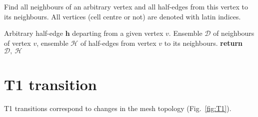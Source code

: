 \documentclass[aps, superscriptaddress, notitlepage]{revtex4-1}
\providecommand\RETURN{\STATE\textbf{return}~}
\begin{document}
\begin{algorithm}[H]
\caption{Find all neighbours of an arbitrary vertex and all half-edges from this vertex to its neighbours. All vertices (cell centre or not) are denoted with latin indices.}
\label{alg:neighbours}
\begin{algorithmic}[1]
\REQUIRE Arbitrary half-edge $\boldsymbol{h}$ departing from a given vertex $v$.
\ENSURE Ensemble $\mathcal{D}$ of neighbours of vertex $v$, ensemble $\mathcal{H}$ of half-edges from vertex $v$ to its neighbours.
 
 
\label{ins:while_neigh}
     
\ENDWHILE
\RETURN $\mathcal{D},~\mathcal{H}$
\end{algorithmic}
\end{algorithm}

\section{T1 transition}

T1 transitions correspond to changes in the mesh topology (Fig.~\ref{fig:T1}).
\end{document}
